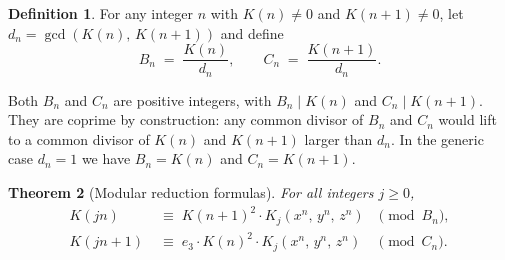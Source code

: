 \documentclass[12pt]{article}
\newtheorem{theorem}{Theorem}[section]
\theoremstyle{definition}
\newtheorem{definition}[theorem]{Definition}
\begin{document}
	\begin{definition}
		\label{def:BnCn}
		For any integer $n$ with $K(n) \neq 0$ and $K(n+1) \neq 0$, let
		$d_n = \gcd(K(n),\, K(n+1))$ and define
		\[
		B_n \;=\; \frac{K(n)}{d_n}, \qquad C_n \;=\; \frac{K(n+1)}{d_n}.
		\]
	\end{definition}
	
	Both $B_n$ and $C_n$ are positive integers, with $B_n \mid K(n)$ and
	$C_n \mid K(n+1)$.  They are coprime by construction: any common
	divisor of $B_n$ and $C_n$ would lift to a common divisor of $K(n)$
	and $K(n+1)$ larger than $d_n$.  In the generic case $d_n = 1$ we
	have $B_n = K(n)$ and $C_n = K(n+1)$.
	
	\begin{theorem}[Modular reduction formulas]
		\label{thm:modular-reduction}
		For all integers $j \geq 0$,
		\begin{align}
			K(jn)   &\;\equiv\; K(n+1)^2 \cdot K_j(x^n,\,y^n,\,z^n) &\pmod{B_n}, \label{eq:mod-Kn}\\
			K(jn+1) &\;\equiv\; e_3 \cdot K(n)^2 \cdot K_j(x^n,\,y^n,\,z^n) &\pmod{C_n}. \label{eq:mod-Kn1}
		\end{align}
	\end{theorem}
\end{document}
